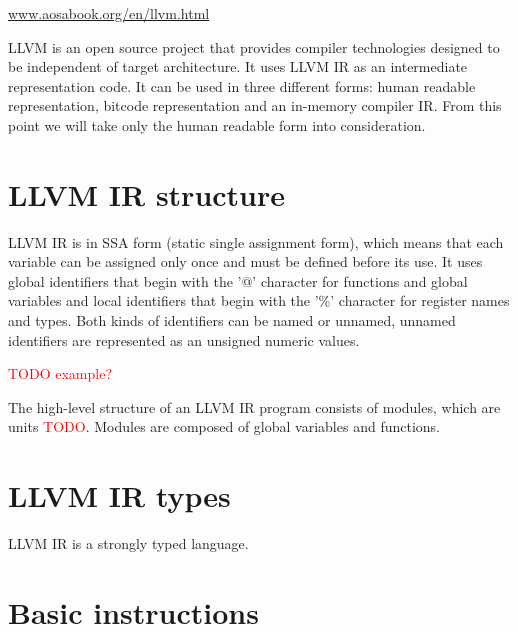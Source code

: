 \url{www.aosabook.org/en/llvm.html}
\medskip

LLVM is an open source project that provides compiler technologies designed to
be independent of target architecture. It uses LLVM IR as an intermediate
representation code. It can be used in three different forms: human readable
representation, bitcode representation and an in-memory compiler IR. From this
point we will take only the human readable form into consideration.

\section{LLVM IR structure} %

LLVM IR is in SSA form (static single assignment form), which means that each
variable can be assigned only once and must be defined before its use. It uses
global identifiers that begin with the '@' character for functions and global
variables and local identifiers that begin with the '\%' character for register
names and types. Both kinds of identifiers can be named or unnamed, unnamed
identifiers are represented as an unsigned numeric values. 

\textcolor{red}{TODO example?}

The high-level structure of an LLVM IR program consists of modules, which are
units \textcolor{red}{TODO}. Modules are composed of global variables and
functions.

\section{LLVM IR types}

LLVM IR is a strongly typed language.

\section{Basic instructions}

